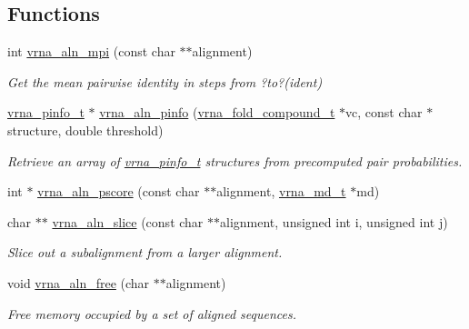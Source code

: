 \subsection*{Functions}
\begin{DoxyCompactItemize}
\item 
int \mbox{\hyperlink{group__aln__utils_gade5a1f2d16e7fd9a57b37d8514f08e8e}{vrna\+\_\+aln\+\_\+mpi}} (const char $\ast$$\ast$alignment)
\begin{DoxyCompactList}\small\item\em Get the mean pairwise identity in steps from ?to?(ident) \end{DoxyCompactList}\item 
\mbox{\hyperlink{group__aln__utils_ga6660dfca23debee7306e0cd53341263f}{vrna\+\_\+pinfo\+\_\+t}} $\ast$ \mbox{\hyperlink{group__aln__utils_gaf6421a1318586c59fea6a127ed9f65f3}{vrna\+\_\+aln\+\_\+pinfo}} (\mbox{\hyperlink{group__fold__compound_ga1b0cef17fd40466cef5968eaeeff6166}{vrna\+\_\+fold\+\_\+compound\+\_\+t}} $\ast$vc, const char $\ast$structure, double threshold)
\begin{DoxyCompactList}\small\item\em Retrieve an array of \mbox{\hyperlink{group__aln__utils_ga6660dfca23debee7306e0cd53341263f}{vrna\+\_\+pinfo\+\_\+t}} structures from precomputed pair probabilities. \end{DoxyCompactList}\item 
int $\ast$ \mbox{\hyperlink{group__aln__utils_ga36343f89b733b21697c981652248abca}{vrna\+\_\+aln\+\_\+pscore}} (const char $\ast$$\ast$alignment, \mbox{\hyperlink{group__model__details_ga1f8a10e12a0a1915f2a4eff0b28ea17c}{vrna\+\_\+md\+\_\+t}} $\ast$md)
\item 
char $\ast$$\ast$ \mbox{\hyperlink{group__aln__utils_gac801b0a72eac4ab9d5b2ef7533db9193}{vrna\+\_\+aln\+\_\+slice}} (const char $\ast$$\ast$alignment, unsigned int i, unsigned int j)
\begin{DoxyCompactList}\small\item\em Slice out a subalignment from a larger alignment. \end{DoxyCompactList}\item 
void \mbox{\hyperlink{group__aln__utils_gac00dc80b8a324f151f92f11ab6850ecf}{vrna\+\_\+aln\+\_\+free}} (char $\ast$$\ast$alignment)
\begin{DoxyCompactList}\small\item\em Free memory occupied by a set of aligned sequences. \end{DoxyCompactList}\item 
$$
\end{DoxyCompactItemize}

